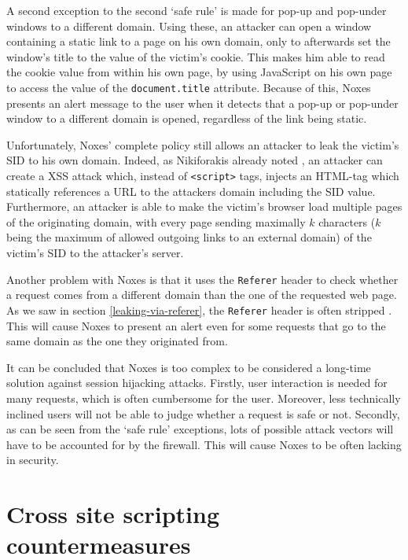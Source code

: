 A second exception to the second `safe rule' is made for pop-up and pop-under windows to a different domain. Using these, an attacker can open a window containing a static link to a page on his own domain, only to afterwards set the window's title to the value of the victim's cookie. This makes him able to read the cookie value from within his own page, by using JavaScript on his own page to access the value of the \texttt{document.title} attribute. Because of this, Noxes presents an alert message to the user when it detects that a pop-up or pop-under window to a different domain is opened, regardless of the link being static.

Unfortunately, Noxes' complete policy still allows an attacker to leak the victim's SID to his own domain. Indeed, as Nikiforakis already noted \cite{Nikiforakis2010}, an attacker can create a XSS attack which, instead of \texttt{<script>} tags, injects an HTML-tag which statically references a URL to the attackers domain including the SID value. Furthermore, an attacker is able to make the victim's browser load multiple pages of the originating domain, with every page sending maximally $k$ characters ($k$ being the maximum of allowed outgoing links to an external domain) of the victim's SID to the attacker's server.

Another problem with Noxes is that it uses the \texttt{Referer} header to check whether a request comes from a different domain than the one of the requested web page. As we saw in section \ref{leaking-via-referer}, the \texttt{Referer} header is often stripped \cite{Barth2008}. This will cause Noxes to present an alert even for some requests that go to the same domain as the one they originated from.

It can be concluded that Noxes is too complex to be considered a long-time solution against session hijacking attacks. Firstly, user interaction is needed for many requests, which is often cumbersome for the user. Moreover, less technically inclined users will not be able to judge whether a request is safe or not. Secondly, as can be seen from the `safe rule' exceptions, lots of possible attack vectors will have to be accounted for by the firewall. This will cause Noxes to be often lacking in security.

\section{Cross site scripting countermeasures}\label{xss-countermeasures}

